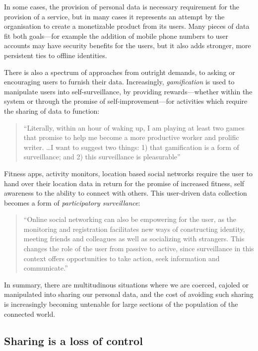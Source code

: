 \documentclass{IOS-Book-Article}     %
\newcommand{\tbox}[3][red]{{
\color{#1}\noindent{
   \fbox{\scriptsize{ {\bf #2} \textsl{#3}}}
   \vspace{2pt}
}
}}
\newcommand{\todo}[1]{\tbox{TODO:}{#1}}
\begin{document}
In some cases, the provision of personal data is
necessary requirement for the provision of a service, but in many
cases it represents an attempt by the organisation to create a monetizable product from
its users. Many pieces of data fit both goals---for example the addition of 
mobile phone numbers to user accounts may have security benefits for the users,
but it also adds stronger, more persistent ties to offline identities.

\todo{Spiekermann ref}
\cite{Novotny2013DEF,Spiekermann2014}

There is also a spectrum of approaches from outright demands, 
to asking or encouraging users to furnish their data.
Increasingly, \emph{gamification} is used to manipulate
users into self-surveillance, by providing rewards---whether within the system
or through the promise of self-improvement---for activities which require the
sharing of data to function:
\begin{quote}``Literally, within an hour of waking up, I am playing at least 
two games that promise to help me become a more productive
worker and prolific writer. \ldots I want to suggest two things: 1) that gamification is a form of
surveillance; and 2) this surveillance is
pleasurable''~\cite{whitson2013gaming}\end{quote}
Fitness apps, activity monitors, location based social networks require the
user to hand over their location data in return for the promise of increased
fitness, self awareness to the ability to connect with others. 
This user-driven data collection becomes a form of \emph{participatory surveillance}:
\begin{quote}
``Online social networking can also be empowering for the user, as the monitoring and 
registration facilitates new ways of constructing identity, meeting friends and colleagues 
as well as socializing with strangers. This changes the role of the user from passive to 
active, since surveillance in this context offers opportunities to take action, seek 
information and communicate.''~\cite{albrechtslund2008online}
\end{quote} 

In summary, there are multitudinous situations where we are coerced, cajoled or
manipulated into sharing our personal data, and the cost of avoiding such
sharing is increasingly becoming untenable for large sections of the population
of the connected world.

\subsection{Sharing is a loss of control}
\end{document}
